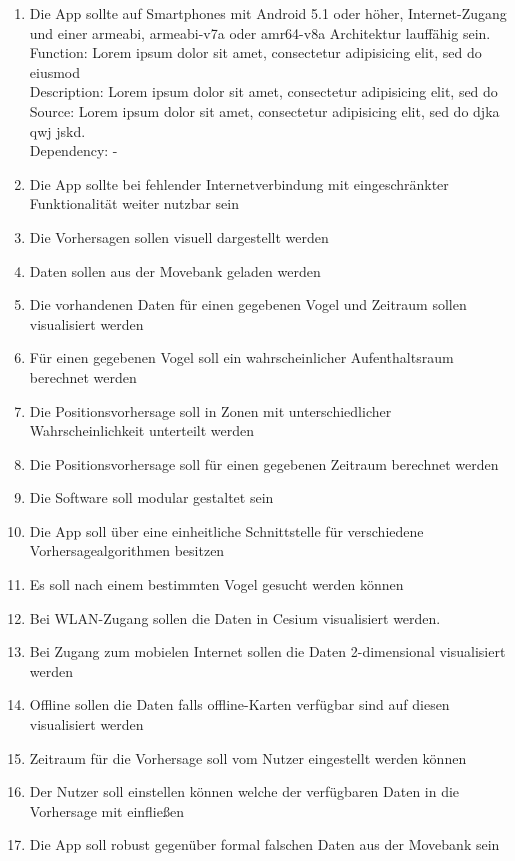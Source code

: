 \documentclass[12pt]{article} %
\begin{document}
\begin{enumerate}[(R1)]
		\item Die App sollte auf Smartphones mit Android 5.1 oder höher, Internet-Zugang und einer armeabi, armeabi-v7a oder amr64-v8a Architektur lauffähig sein. \\
		Function: Lorem ipsum dolor sit amet, consectetur adipisicing elit, sed do eiusmod \\
		Description:  Lorem ipsum dolor sit amet, consectetur adipisicing elit, sed do \\
		Source:  Lorem ipsum dolor sit amet, consectetur adipisicing elit, sed do djka qwj jskd. \\
		Dependency: -
		\item Die App sollte bei fehlender Internetverbindung mit eingeschränkter Funktionalität weiter nutzbar sein
		\item Die Vorhersagen sollen visuell dargestellt werden
		\item Daten sollen aus der Movebank geladen werden
		\item Die vorhandenen Daten für einen gegebenen Vogel und Zeitraum sollen visualisiert werden
		\item Für einen gegebenen Vogel soll ein wahrscheinlicher Aufenthaltsraum berechnet werden
		\item Die Positionsvorhersage soll in Zonen mit unterschiedlicher Wahrscheinlichkeit unterteilt werden
		\item Die Positionsvorhersage soll für einen gegebenen Zeitraum berechnet werden
		\item Die Software soll modular gestaltet sein
		\item Die App soll über eine einheitliche Schnittstelle für verschiedene Vorhersagealgorithmen besitzen
		\item Es soll nach einem bestimmten Vogel gesucht werden können
		\item Bei WLAN-Zugang sollen die Daten in Cesium visualisiert werden.
		\item Bei Zugang zum mobielen Internet sollen die Daten 2-dimensional visualisiert werden
		\item Offline sollen die Daten falls offline-Karten verfügbar sind auf diesen visualisiert werden
		\item Zeitraum für die Vorhersage soll vom Nutzer eingestellt werden können
		\item Der Nutzer soll einstellen können welche der verfügbaren Daten in die Vorhersage mit einfließen
		\item Die App soll robust gegenüber formal falschen Daten aus der Movebank sein

\end{enumerate}
\end{document}
